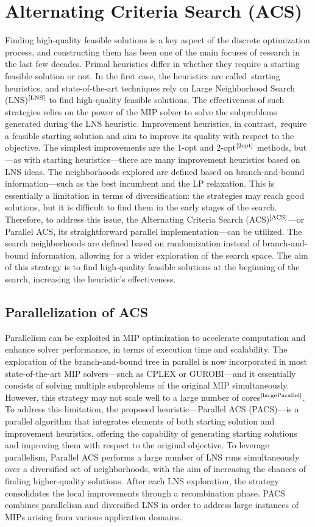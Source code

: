 \section{Alternating Criteria Search (ACS)}
Finding high-quality feasible solutions is a key aspect of the discrete optimization process, and constructing them has been one of the main focuses of research in the last few decades.  
Primal heuristics differ in whether they require a starting feasible solution or not. In the first case, the heuristics are called starting heuristics, and state-of-the-art techniques rely on Large Neighborhood Search (LNS)$^\text{\cite{LNS}}$ to find high-quality feasible solutions. The effectiveness of such strategies relies on the power of the MIP solver to solve the subproblems generated during the LNS heuristic.  
Improvement heuristics, in contrast, require a feasible starting solution and aim to improve its quality with respect to the objective. The simplest improvements are the 1-opt and 2-opt$^\text{\cite{2opt}}$ methods, but—as with starting heuristics—there are many improvement heuristics based on LNS ideas. The neighborhoods explored are defined based on branch-and-bound information—such as the best incumbent and the LP relaxation.  
This is essentially a limitation in terms of diversification: the strategies may reach good solutions, but it is difficult to find them in the early stages of the search.  
Therefore, to address this issue, the Alternating Criteria Search (ACS)$^\text{\cite{ACS}}$—or Parallel ACS, its straightforward parallel implementation—can be utilized. The search neighborhoods are defined based on randomization instead of branch-and-bound information, allowing for a wider exploration of the search space. The aim of this strategy is to find high-quality feasible solutions at the beginning of the search, increasing the heuristic's effectiveness.

\subsection{Parallelization of ACS}
Parallelism can be exploited in MIP optimization to accelerate computation and enhance solver performance, in terms of execution time and scalability.
The exploration of the branch-and-bound tree in parallel is now incorporated in most state-of-the-art MIP solvers—such as CPLEX or GUROBI—and it essentially consists of solving multiple subproblems of the original MIP simultaneously.  
However, this strategy may not scale well to a large number of cores$^\text{\cite{largeParallel}}$.
To address this limitation, the proposed heuristic—Parallel ACS (PACS)—is a parallel algorithm that integrates elements of both starting solution and improvement heuristics, offering the capability of generating starting solutions and improving them with respect to the original objective.  
To leverage parallelism, Parallel ACS performs a large number of LNS runs simultaneously over a diversified set of neighborhoods, with the aim of increasing the chances of finding higher-quality solutions. After each LNS exploration, the strategy consolidates the local improvements through a recombination phase.  
PACS combines parallelism and diversified LNS in order to address large instances of MIPs arising from various application domains.

